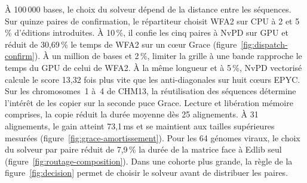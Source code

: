 À 100\,000 bases, le choix du solveur dépend de la distance entre les séquences. Sur quinze paires de confirmation, le répartiteur choisit WFA2 sur CPU à 2 et 5\,\% d’éditions introduites. À 10\,\%, il confie les cinq paires à NvPD sur GPU et réduit de 30,69\,\% le temps de WFA2 sur un cœur Grace (figure~\ref{fig:dispatch-confirm}). À un million de bases et 2\,\%, limiter la grille à une bande rapproche le temps du GPU de celui de WFA2. À la même longueur et à 5\,\%, NvPD vectorisé calcule le score 13,32 fois plus vite que les anti-diagonales sur huit cœurs EPYC. Sur les chromosomes~1 à~4 de CHM13, la réutilisation des séquences détermine l’intérêt de les copier sur la seconde puce Grace. Lecture et libération mémoire comprises, la copie réduit la durée moyenne dès 25 alignements. À 31 alignements, le gain atteint 73,1\,ms et se maintient aux tailles supérieures mesurées (figure~\ref{fig:grace-amortissement}). Pour les 64 génomes viraux, le choix du solveur par paire réduit de 7,9\,\% la durée de la matrice face à Edlib seul (figure~\ref{fig:routage-composition}). Dans une cohorte plus grande, la règle de la figure~\ref{fig:decision} permet de choisir le solveur avant de distribuer les paires.
